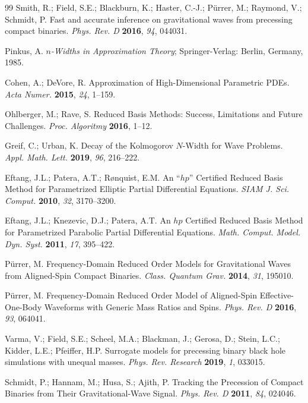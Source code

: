\documentclass[11pt, a4paper]{article}
\begin{document}
\begin{thebibliography}{99}
Smith, R.; Field, S.E.; Blackburn, K.; Haster, C.-J.; P\"urrer, M.; Raymond, V.; Schmidt, P. Fast and accurate inference on gravitational waves from precessing compact binaries. \textit{Phys. Rev. D} \textbf{2016}, \textit{94}, 044031.

Pinkus, A. \textit{$n$-Widths in Approximation Theory}; Springer-Verlag: Berlin, Germany, 1985.

Cohen, A.; DeVore, R. Approximation of High-Dimensional Parametric PDEs. \textit{Acta Numer.} \textbf{2015}, \textit{24}, 1--159.

Ohlberger, M.; Rave, S. Reduced Basis Methods: Success, Limitations and Future Challenges. \textit{Proc. Algoritmy} \textbf{2016}, 1--12.

Greif, C.; Urban, K. Decay of the Kolmogorov $N$-Width for Wave Problems. \textit{Appl. Math. Lett.} \textbf{2019}, \textit{96}, 216--222.

Eftang, J.L.; Patera, A.T.; R\o nquist, E.M. An ``$hp$'' Certified Reduced Basis Method for Parametrized Elliptic Partial Differential Equations. \textit{SIAM J. Sci. Comput.} \textbf{2010}, \textit{32}, 3170--3200.

Eftang, J.L.; Knezevic, D.J.; Patera, A.T. An $hp$ Certified Reduced Basis Method for Parametrized Parabolic Partial Differential Equations. \textit{Math. Comput. Model. Dyn. Syst.} \textbf{2011}, \textit{17}, 395--422.

P\"urrer, M. Frequency-Domain Reduced Order Models for Gravitational Waves from Aligned-Spin Compact Binaries. \textit{Class. Quantum Grav.} \textbf{2014}, \textit{31}, 195010.

P\"urrer, M. Frequency-Domain Reduced Order Model of Aligned-Spin Effective-One-Body Waveforms with Generic Mass Ratios and Spins. \textit{Phys. Rev. D} \textbf{2016}, \textit{93}, 064041.

Varma, V.; Field, S.E.; Scheel, M.A.; Blackman, J.; Gerosa, D.; Stein, L.C.; Kidder, L.E.; Pfeiffer, H.P. Surrogate models for precessing binary black hole simulations with unequal masses. \textit{Phys. Rev. Research} \textbf{2019}, \textit{1}, 033015.

Schmidt, P.; Hannam, M.; Husa, S.; Ajith, P. Tracking the Precession of Compact Binaries from Their Gravitational-Wave Signal. \textit{Phys. Rev. D} \textbf{2011}, \textit{84}, 024046.


\end{thebibliography}
\end{document}
